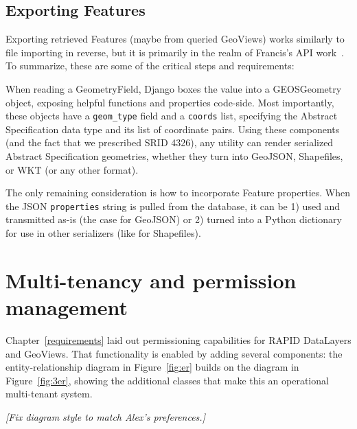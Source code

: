 \subsection{Exporting Features}
\label{sec:export}
Exporting retrieved Features (maybe from queried GeoViews) works similarly to file importing in reverse, but it is primarily in the realm of Francis's API work~\cite{Francis}. To summarize, these are some of the critical steps and requirements:

When reading a GeometryField, Django boxes the value into a GEOSGeometry object, exposing helpful functions and properties code-side. Most importantly, these objects have a \texttt{geom\_type} field and a \texttt{coords} list, specifying the Abstract Specification data type and its list of coordinate pairs. Using these components (and the fact that we prescribed SRID 4326), any utility can render serialized Abstract Specification geometries, whether they turn into GeoJSON, Shapefiles, or WKT (or any other format).

The only remaining consideration is how to incorporate Feature properties. When the JSON \texttt{properties} string is pulled from the database, it can be 1) used and transmitted as-is (the case for GeoJSON) or 2) turned into a Python dictionary for use in other serializers (like for Shapefiles).


\section{Multi-tenancy and permission management}
Chapter~\ref{requirements} laid out permissioning capabilities for RAPID DataLayers and GeoViews. That functionality is enabled by adding several components: the entity-relationship diagram in Figure~\ref{fig:er} builds on the diagram in Figure~\ref{fig:3er}, showing the additional classes that make this an operational multi-tenant system.

\textit{[Fix diagram style to match Alex's preferences.]}

